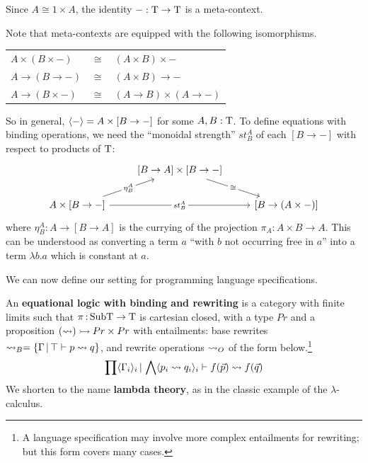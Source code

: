 \documentclass{article}
\begin{document}
Since $A\cong 1\times A$, the identity $-:\mathrm{T}\to \mathrm{T}$ is a meta-context.

Note that meta-contexts are equipped with the following isomorphisms.
\begin{center}
    \renewcommand{\arraystretch}{1.2}
    \begin{tabular}{lcl}
        $A\times (B\times -)$ & $\cong$ & $(A\times B)\times -$\\
        $A\to (B\to -)$ & $\cong$ & $(A\times B)\to -$\\
        $A\to (B\times -)$ & $\cong$ & $(A\to B)\times (A\to -)$
    \end{tabular}
\end{center}
So in general, $\langle -\rangle= A\times [B\to -]$ for some $A,B:\mathrm{T}$. To define equations with binding operations, we need the ``monoidal strength'' $st_B^A$ of each $[B\to -]$ with respect to products of $\mathrm{T}$:
\[\begin{tikzcd}
	& {[B\to A]\times [B\to -]} \\
	{A\times [B\to -]} && {[B\to (A\times -)]}
	\arrow["\cong"{description}, from=1-2, to=2-3]
	\arrow["{\eta_B^A}"{description}, from=2-1, to=1-2]
	\arrow["{st_B^A}"{description}, from=2-1, to=2-3]
\end{tikzcd}\]
where $\eta_B^A:A\to [B\to A]$ is the currying of the projection $\pi_A:A\times B\to A$. This can be understood as converting a term $a$ ``with $b$ not occurring free in $a$'' into a term $\lambda b.a$ which is constant at $a$.

We can now define our setting for programming language specifications.

\begin{definition}
    An \textbf{equational logic with binding and rewriting} is a category with finite limits such that $\pi\,{:}\, \mathrm{SubT\to T}$ is cartesian closed, with a type $Pr$ and a proposition $(\rightsquigarrow)\rightarrowtail Pr\times Pr$ with entailments: base rewrites $\rightsquigarrow_B = \{\Gamma\,|\, \top\vdash p\rightsquigarrow q\}$, and rewrite operations $\rightsquigarrow_O$ of the form below.\footnote{A language specification may involve more complex entailments for rewriting; but this form covers many cases.}
    \[\prod \langle \Gamma_i\rangle_i\,|\, \bigwedge \langle p_i\rightsquigarrow q_i\rangle_i\vdash f(\vec{p})\rightsquigarrow f(\vec{q})\]
    We shorten to the name \textbf{lambda theory}, as in the classic example of the $\lambda$-calculus.
\end{definition}

\newpage
\end{document}
